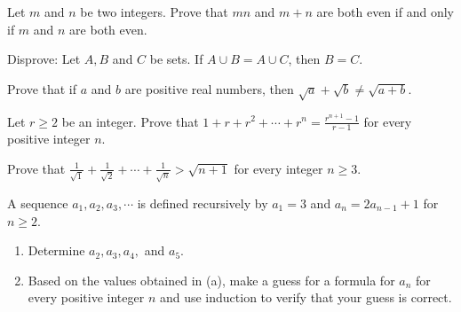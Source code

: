 \documentclass{homework}
\begin{document}
\question Let $m$ and $n$ be two integers. Prove that $mn$ and $m + n$ are both even if and only if $m$ and $n$ are both even.


\question Disprove: Let $A, B$ and $C$ be sets. If $A \cup B = A \cup C$, then $B = C$.


\question Prove that if $a$ and $b$ are positive real numbers, then $\sqrt{a} + \sqrt{b} \neq \sqrt{a+b}$.


\question Let $r \geq 2$ be an integer. Prove that $1 + r + r^{2} + \cdots + r^{n} = \frac{r^{n+1}-1}{r-1}$ for every positive integer $n$.




\question Prove that $\frac{1}{\sqrt{1}} + \frac{1}{\sqrt{2}} + \cdots + \frac{1}{\sqrt{n}} > \sqrt{n+1} $ for every integer $n\geq 3$.


\question A sequence $a_{1}, a_{2}, a_{3},\cdots$ is defined recursively by $a_{1} = 3$ and $a_{n} = 2a_{n-1} + 1$ for $n\geq 2$.
\begin{enumerate}[label=(\alph*)]
	\item Determine $a_{2}, a_{3}, a_{4},$ and $a_{5} $.
	\item Based on the values obtained in (a), make a guess for a formula for $a_{n}$ for every positive integer $n$ and use induction to verify that your guess is correct.
\end{enumerate}
\end{document}
